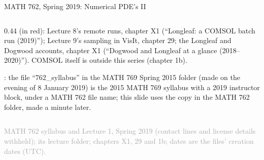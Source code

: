 \documentclass[aspectratio=169,11pt]{beamer}
\newcommand{\sourcecredit}[1]{\vfill\begin{flushright}\tiny\textcolor{DarkGray}{#1}\end{flushright}}
\begin{document}
\begin{frame}{MATH 762, Spring 2019: Numerical PDE's II}
\begin{columns}[T,onlytextwidth]
\begin{column}{0.44\textwidth}
\vspace{1.5mm}
\scriptsize {} (in red): Lecture 8's remote runs, chapter X1 (``Longleaf: a COMSOL batch run (2019)''); Lecture 9's sampling in VisIt, chapter 29; the Longleaf and Dogwood accounts, chapter X1 (``Dogwood and Longleaf at a glance (2018--2020)''). COMSOL itself is outside this series (chapter 1b).

\vspace{1mm}
\tiny {}: the file ``762\_syllabus'' in the MATH 769 Spring 2015 folder (made on the evening of 8 January 2019) is the 2015 MATH 769 syllabus with a 2019 instructor block, under a MATH 762 file name; this slide uses the copy in the MATH 762 folder, made a minute later.
\end{column}
\end{columns}
\sourcecredit{MATH 762 syllabus and Lecture 1, Spring 2019 (contact lines and license details withheld); its lecture folder; chapters X1, 29 and 1b; dates are the files' creation dates (UTC).}
\end{frame}
\end{document}
